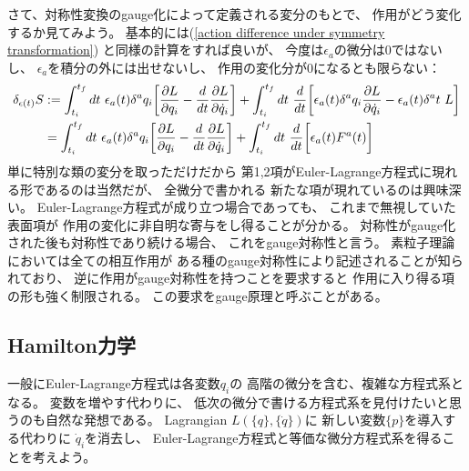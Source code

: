 さて、対称性変換のgauge化によって定義される変分のもとで、
作用がどう変化するか見てみよう。
基本的には(\ref{action difference under symmetry transformation})
と同様の計算をすれば良いが、
今度は$\epsilon_a$の微分は$0$ではないし、
$\epsilon_a$を積分の外には出せないし、
作用の変化分が$0$になるとも限らない：
\begin{align}
  \delta_{\epsilon(t)} S
  &:=
  \int_{t_i}^{t_f} dt
  \ 
  \epsilon_a(t)
  \delta^a q_i
  \bigg[
    \dfrac{\partial L}{\partial q_i}
  -
  \dfrac{d}{dt}
    \dfrac{\partial L}{\partial \dot{q}_i}
  \bigg]
  +
  \int_{t_i}^{t_f} dt
  \ 
  \dfrac{d}{dt}
  \bigg[
    \epsilon_a(t)
    \delta^a q_i
    \dfrac{\partial L}{\partial \dot{q}_i}
  -
    \epsilon_a(t)
    \delta^a t
    \ 
    L
  \bigg]
\notag\\&=
  \int_{t_i}^{t_f} dt
  \ 
  \epsilon_a(t)
  \delta^a q_i
  \bigg[
    \dfrac{\partial L}{\partial q_i}
  -
  \dfrac{d}{dt}
    \dfrac{\partial L}{\partial \dot{q}_i}
  \bigg]
  +
  \int_{t_i}^{t_f} dt
  \ 
  \dfrac{d}{dt}
  \bigg[
    \epsilon_a(t)
    F^a(t)
  \bigg]
\end{align}
単に特別な類の変分を取っただけだから
第1,2項がEuler-Lagrange方程式に現れる形であるのは当然だが、
全微分で書かれる
新たな項が現れているのは興味深い。
Euler-Lagrange方程式が成り立つ場合であっても、
これまで無視していた表面項が
作用の変化に非自明な寄与をし得ることが分かる。
対称性がgauge化された後も対称性であり続ける場合、
これをgauge対称性と言う。
素粒子理論においては全ての相互作用が
ある種のgauge対称性により記述されることが知られており、
逆に作用がgauge対称性を持つことを要求すると
作用に入り得る項の形も強く制限される。
この要求をgauge原理と呼ぶことがある。

\subsection{Hamilton力学}

一般にEuler-Lagrange方程式は各変数$q_i$の
高階の微分を含む、複雑な方程式系となる。
変数を増やす代わりに、
低次の微分で書ける方程式系を見付けたいと思うのも自然な発想である。
Lagrangian $L(\{q\},\{\dot{q}\})$に
新しい変数$\{p\}$を導入する代わりに
$\dot{q}_i$を消去し、
Euler-Lagrange方程式と等価な微分方程式系を得ることを考えよう。

